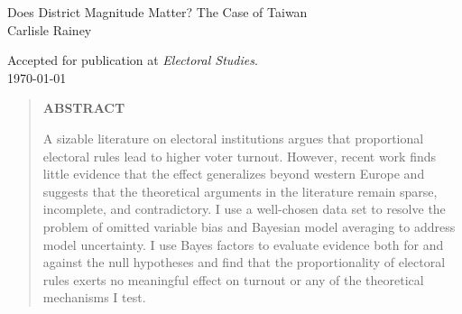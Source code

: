 \documentclass[12pt]{article}
\begin{document}
\begin{center}
{\LARGE Does District Magnitude Matter? The Case of Taiwan}\\\vspace{2mm}
\vspace{10mm}
Carlisle Rainey\\
\vspace{5mm}
\begin{footnotesize}
Accepted for publication at \textit{Electoral Studies}.\\
\vspace{3mm}
\today
\end{footnotesize}
\end{center}


\vspace{10mm}
\begin{quote}
\begin{center} \bf{ABSTRACT}\end{center}
A sizable literature on electoral institutions argues that proportional electoral rules lead to higher voter turnout. However, recent work finds little evidence that the effect generalizes beyond western Europe and suggests that the theoretical arguments in the literature remain sparse, incomplete, and contradictory. I use a well-chosen data set to resolve the problem of omitted variable bias and Bayesian model averaging to address model uncertainty. I use Bayes factors to evaluate evidence both for and against the null hypotheses and find that the proportionality of electoral rules exerts no meaningful effect on turnout or any of the theoretical mechanisms I test.
\end{quote}
\clearpage
\end{document}
